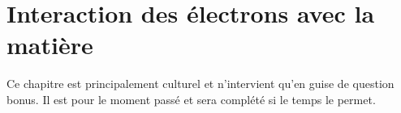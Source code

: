 \chapter{Interaction des électrons avec la matière}
Ce chapitre est principalement culturel et n'intervient qu'en guise de question bonus. Il est 
pour le moment passé et sera complété si le temps le permet.

